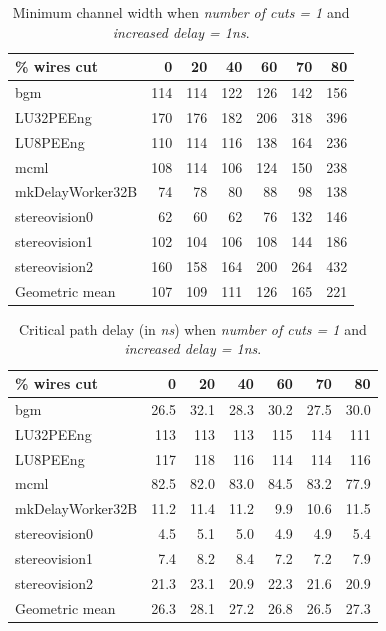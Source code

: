\documentclass{sig-alternate-2013}
\begin{document}
\begin{table}[!htbp]
\begin{tabular}{|l|r|r|r|r|r|r|}
\hline
\% wires cut & 0 & 20 & 40 & 60 & 70 & 80 \\ \hline \hline
bgm & 114 & 114 & 122 & 126 & 142 & 156 \\ \hline
LU32PEEng & 170 & 176 & 182 & 206 & 318 & 396 \\ \hline
LU8PEEng & 110 & 114 & 116 & 138 & 164 & 236 \\ \hline
mcml & 108 & 114 & 106 & 124 & 150 & 238 \\ \hline
mkDelayWorker32B & 74 & 78 & 80 & 88 & 98 & 138 \\ \hline
stereovision0 & 62 & 60 & 62 & 76 & 132 & 146 \\ \hline
stereovision1 & 102 & 104 & 106 & 108 & 144 & 186 \\ \hline
stereovision2 & 160 & 158 & 164 & 200 & 264 & 432 \\ \hline
Geometric mean & 107 & 109 & 111 & 126 & 165 & 221 \\ \hline
\end{tabular}
\caption{Minimum channel width when \textit{number of cuts = 1} and \textit{increased delay = 1ns}.}
\label{table:1cut_minW}
\end{table}

\begin{table}[!htbp]
\begin{tabular}{|l|r|r|r|r|r|r|}
\hline
\% wires cut & 0 & 20 & 40 & 60 & 70 & 80 \\ \hline \hline
bgm & 26.5 & 32.1 & 28.3 & 30.2 & 27.5 & 30.0 \\ \hline
LU32PEEng & 113 & 113 & 113 & 115 & 114 & 111 \\ \hline
LU8PEEng & 117 & 118 & 116 & 114 & 114 & 116 \\ \hline
mcml & 82.5 & 82.0 & 83.0 & 84.5 & 83.2 & 77.9 \\ \hline
mkDelayWorker32B & 11.2 & 11.4 & 11.2 & 9.9 & 10.6 & 11.5 \\ \hline
stereovision0 & 4.5 & 5.1 & 5.0 & 4.9 & 4.9 & 5.4 \\ \hline
stereovision1 & 7.4 & 8.2 & 8.4 & 7.2 & 7.2 & 7.9 \\ \hline
stereovision2 & 21.3 & 23.1 & 20.9 & 22.3 & 21.6 & 20.9 \\ \hline
Geometric mean & 26.3 & 28.1 & 27.2 & 26.8 & 26.5 & 27.3 \\ \hline
\end{tabular}
\caption{Critical path delay (in \textit{ns}) when \textit{number of cuts = 1} and \textit{increased delay = 1ns}.}
\label{table:1cut_path}
\end{table}
\end{document}
